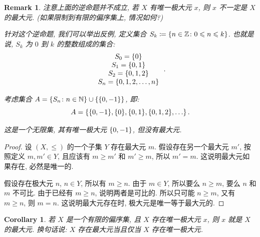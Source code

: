 \documentclass[UTF8]{ctexart}
\theoremstyle{mystyle}
\theoremstyle{myremark}
\newtheorem*{remark}{Remark}
\theoremstyle{plain}
\newtheorem{corollary}{Corollary}[section]
\newcommand{\Z}{\mathbb Z}
\newcommand{\N}{\mathbb N}
\DeclarePairedDelimiter\set{\{}{\}}
\begin{document}
\begin{remark}
    注意上面的逆命题并不成立, 若 $ X $ 有唯一极大元 $ x $, 则 $ x $ 不一定是 $ X $ 的最大元. (如果限制到有限的偏序集上, 情况如何?)

    针对这个逆命题, 我们可以举出反例, 定义集合 $ S_k \coloneqq \set{n \in \Z \colon 0 \leqslant n \leqslant k} $. 也就是说, $ S_k $ 为 $ 0 $ 到 $ k $ 的整数组成的集合:
    \[ \begin{array}{c}
        S_0 = \set{0} \\
        S_1 = \set{0, 1} \\
        S_2 = \set{0, 1, 2} \\
        S_n = \set{0, 1, 2, \dots, n}
    \end{array} \,.\]

    考虑集合 $ A = \set{S_n \colon n \in \N} \cup \set{\set{0, -1}} $, 即:
    \[ A = \set{\set{0, -1}, \set{0}, \set{0, 1}, \set{0, 1, 2}, \dots} \,.\]

    这是一个无限集, 其有唯一极大元 $ \set{0, -1} $, 但没有最大元.
\end{remark}

\begin{proof}
    设 $ (X, \le) $ 的一个子集 $ Y $ 存在最大元 $ m $. 假设存在另一个最大元 $ m' $, 按照定义 $ m, m' \in Y $, 且应该有 $ m \ge m' $ 和 $ m' \ge m $, 所以 $ m' = m $. 这说明最大元如果存在, 必然是唯一的.

    假设存在极大元 $ n $, $ n \in Y $, 所以有 $ m \ge n $.
    由于 $ m \in Y $, 所以要么 $ n \ge m $, 要么 $ n $ 和 $ m $ 不可比. 由于已经有 $ m \ge n $, 说明两者是可比的. 所以只可能 $ n \ge m $, 又有 $ m \ge n $, 则 $ m = n $. 这说明最大元存在时, 极大元是唯一等于最大元的.
\end{proof}

\begin{corollary}
    若 $ X $ 是一个有限的偏序集, 且 $ X $ 存在唯一极大元 $ x $, 则 $ x $ 就是 $ X $ 的最大元. 换句话说: $ X $ 存在最大元当且仅当 $ X $ 存在唯一极大元.
\end{corollary}
\end{document}
